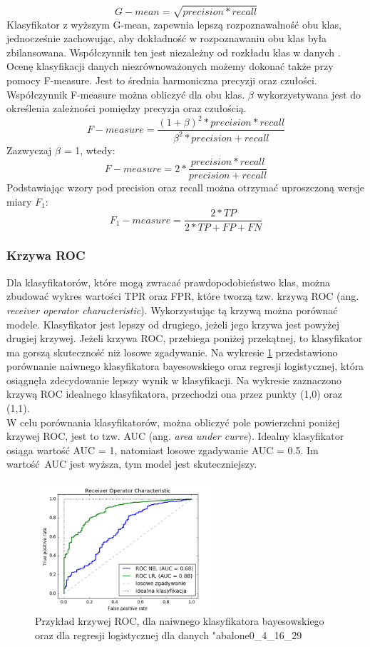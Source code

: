 \[G-mean = \sqrt{precision*recall}\]
Klasyfikator z wyższym G-mean, zapewnia lepszą rozpoznawalność obu klas, jednocześnie zachowując, aby dokładność w rozpoznawaniu obu klas była zbilansowana. Współczynnik ten jest niezależny od rozkładu klas w danych \cite{Garcia}.
\\
Ocenę klasyfikacji danych niezrównoważonych możemy dokonać także przy pomocy F-measure. Jest to średnia harmoniczna precyzji oraz czułości. Współczynnik F-measure można obliczyć dla obu klas. $\beta$ wykorzystywana jest do określenia zależności pomiędzy precyzja oraz czułością.
\[F-measure= \frac{(1+\beta)^2*precision*recall}{\beta^2*precision+recall}\]
Zazwyczaj $\beta$ = 1, wtedy:
\[F-measure= 2*\frac{precision*recall}{precision+recall}\]
Podstawiając wzory pod precision oraz recall można otrzymać uproszczoną wersje miary $F_1$:
\[F_1-measure= \frac{2*TP}{2*TP+FP+FN}\]

\subsubsection{Krzywa ROC}
Dla klasyfikatorów, które mogą zwracać prawdopodobieństwo klas, można zbudować wykres wartości TPR oraz FPR, które tworzą tzw. krzywą ROC (ang. \textit{receiver operator characteristic}). Wykorzystując tą krzywą można porównać modele. Klasyfikator jest lepszy od drugiego, jeżeli jego krzywa jest powyżej drugiej krzywej. Jeżeli krzywa ROC, przebiega poniżej przekątnej, to klasyfikator ma gorszą skuteczność niż losowe zgadywanie. Na wykresie \ref{fig:krzywa_roc} przedstawiono porównanie naiwnego klasyfikatora bayesowskiego oraz regresji logistycznej, która osiągnęła zdecydowanie lepszy wynik w klasyfikacji. Na wykresie zaznaczono krzywą ROC idealnego klasyfikatora, przechodzi ona przez punkty (1,0) oraz (1,1).\\
W celu porównania klasyfikatorów, można obliczyć pole powierzchni poniżej krzywej ROC, jest to tzw. AUC (ang. \textit{area under curve}). Idealny klasyfikator osiąga wartość AUC = 1, natomiast losowe zgadywanie AUC = 0.5. Im wartość AUC jest wyższa, tym model jest skuteczniejszy.
\begin{figure}[h]
	\centering
	\includegraphics[width=0.6\textwidth]{./images/roc.png}
	\caption{Przykład krzywej ROC, dla naiwnego klasyfikatora bayesowskiego oraz dla regresji logistycznej dla danych "abalone0\_4\_16\_29}
	\label{fig:krzywa_roc}
\end{figure}

